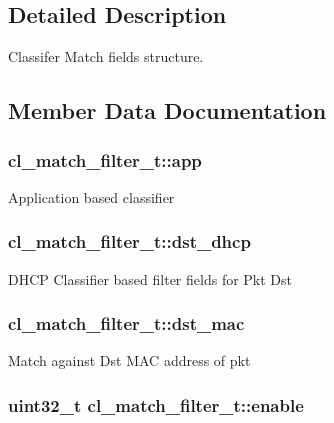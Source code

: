 \subsection{Detailed Description}
Classifer Match fields structure. 

\subsection{Member Data Documentation}
\hypertarget{structcl__match__filter__t_ae968b9a6e2eaa31437509679e6c7c5c9}{
\subsubsection[{app}]{ cl\-\_\-match\-\_\-filter\-\_\-t\-::app}}\label{structcl__match__filter__t_ae968b9a6e2eaa31437509679e6c7c5c9}
Application based classifier \hypertarget{structcl__match__filter__t_af34f72c117557e50b1d5fb3bf0aa1733}{
\subsubsection[{dst\-\_\-dhcp}]{ cl\-\_\-match\-\_\-filter\-\_\-t\-::dst\-\_\-dhcp}}\label{structcl__match__filter__t_af34f72c117557e50b1d5fb3bf0aa1733}
D\-H\-C\-P Classifier based filter fields for Pkt Dst \hypertarget{structcl__match__filter__t_ad4fd6c5bb8a5e61910b1542677c86b98}{
\subsubsection[{dst\-\_\-mac}]{ cl\-\_\-match\-\_\-filter\-\_\-t\-::dst\-\_\-mac}}\label{structcl__match__filter__t_ad4fd6c5bb8a5e61910b1542677c86b98}
Match against Dst M\-A\-C address of pkt \hypertarget{structcl__match__filter__t_abb961ab5e05074003112e334646955b8}{
\subsubsection[{enable}]{\setlength{\rightskip}{0pt plus 5cm}uint32\-\_\-t cl\-\_\-match\-\_\-filter\-\_\-t\-::enable}}\label{structcl__match__filter__t_abb961ab5e05074003112e334646955b8}
